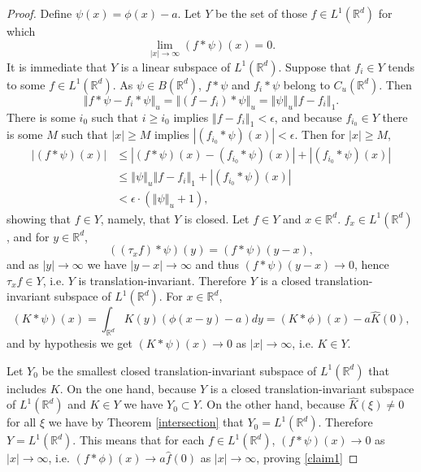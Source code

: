 \documentclass{article}
\newcommand{\norm}[1]{\left\Vert #1 \right\Vert}
\theoremstyle{definition}
\begin{document}
\begin{proof}
Define $\psi(x)=\phi(x)-a$. Let $Y$ be the set of those $f \in L^1(\mathbb{R}^d)$ for which
\[
\lim_{|x| \to \infty} (f*\psi)(x)=0.
\]
It is immediate that $Y$ is a linear subspace of $L^1(\mathbb{R}^d)$. Suppose that $f_i \in Y$ tends to some $f \in L^1(\mathbb{R}^d)$. As $\psi \in B(\mathbb{R}^d)$,
$f*\psi$ and $f_i*\psi$ belong to $C_u(\mathbb{R}^d)$. 
Then
\[
\norm{f*\psi-f_i*\psi}_u = \norm{(f-f_i)*\psi}_u = \norm{\psi}_u \norm{f-f_i}_1.
\]
There is some $i_0$ such that $i \geq i_0$ implies $\norm{f-f_i}_1<\epsilon$, and because $f_{i_0} \in Y$ there is some $M$ such that
$|x| \geq M$ implies $|(f_{i_0}*\psi)(x)| < \epsilon$. Then for $|x| \geq M$,
\begin{align*}
|(f*\psi)(x)| & \leq |(f*\psi)(x)-(f_{i_0}*\psi)(x)|+|(f_{i_0}*\psi)(x)|\\
&\leq  \norm{\psi}_u \norm{f-f_i}_1 +|(f_{i_0}*\psi)(x)|\\
&<\epsilon \cdot (\norm{\psi}_u+1),
\end{align*}
showing that $f \in Y$, namely, that $Y$ is closed. 
Let $f \in Y$ and $x \in \mathbb{R}^d$. $f_x \in L^1(\mathbb{R}^d)$, and for $y \in \mathbb{R}^d$,
\[
((\tau_x f)*\psi)(y) = (f*\psi)(y-x),
\]
and as $|y| \to \infty$ we have $|y-x| \to \infty$ and thus $(f*\psi)(y-x) \to 0$, hence $\tau_x f \in Y$, i.e. $Y$ is translation-invariant.
Therefore $Y$ is a closed translation-invariant subspace of $L^1(\mathbb{R}^d)$. 
For $x \in \mathbb{R}^d$,
\[
(K*\psi)(x) = \int_{\mathbb{R}^d} K(y)(\phi(x-y)-a) dy = 
(K*\phi)(x)-a\hat{K}(0),
\]
and by hypothesis we get $(K*\psi)(x) \to 0$ as $|x| \to \infty$, i.e. $K \in Y$. 

Let $Y_0$ be the smallest closed translation-invariant subspace of $L^1(\mathbb{R}^d)$ that includes $K$.
On the one hand, because $Y$ is a closed translation-invariant subspace of $L^1(\mathbb{R}^d)$ and $K \in Y$ we have
$Y_0 \subset Y$. On the other hand, because $\hat{K}(\xi) \neq 0$ for all $\xi$ we have by 
Theorem \ref{intersection} 
that $Y_0 = L^1(\mathbb{R}^d)$. Therefore $Y=L^1(\mathbb{R}^d)$. This means that for each $f \in L^1(\mathbb{R}^d)$,
$(f*\psi)(x) \to 0$ as $|x| \to \infty$, i.e. $(f*\phi)(x) \to a\hat{f}(0)$ as $|x| \to \infty$, proving \eqref{claim1}


\end{proof}
\end{document}
